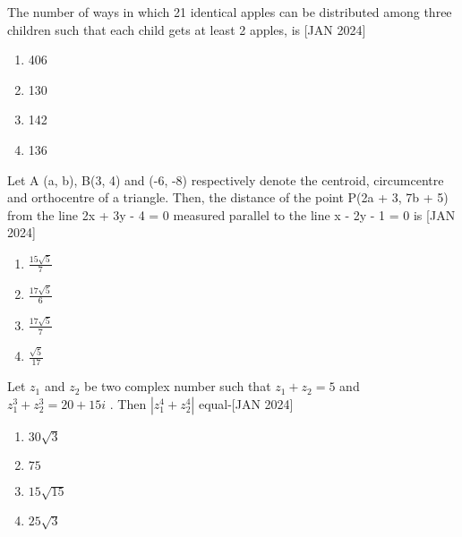 \iffalse
  \title{Assignment}
  \author{ee24btech11030}
  \section{mcq-single}
\fi

\item  The number of ways in which 21 identical apples can be distributed among three children such that each child gets at least 2 apples, is \hfill{[JAN 2024]}
    \begin{multicols}{4}
    \begin{enumerate}
        \item 406
        \item 130
        \item 142
        \item 136
    \end{enumerate}
    \end{multicols}
    \bigskip
    \item Let A (a, b), B(3, 4) and (-6, -8) respectively denote the centroid, circumcentre and orthocentre of a triangle. Then, the distance of the point P(2a + 3, 7b + 5) from the line 2x + 3y - 4 = 0 measured parallel to the line x - 2y - 1 = 0 is  \hfill{[JAN 2024]}
    \begin{multicols}{4}
    \begin{enumerate}
        \item $\frac{15\sqrt{5}}{7}$
        \item $\frac{17\sqrt{5}}{6}$
        \item $\frac{17\sqrt{5}}{7}$
        \item $\frac{\sqrt{5}}{17}$
    \end{enumerate} 
    \end{multicols}
    \bigskip
    \item Let $z_1$ and $z_2$ be two complex number such that $z_1 + z_2 = 5$ and $z_1^3 + z_2^3 = 20 + 15i$ . Then  $|z_1^{4} + z_2^{4}|$ equal-\hfill{[JAN 2024]}
    \begin{multicols}{4}
    \begin{enumerate}
        \item $30\sqrt{3}$
        \item $75$
        \item $15\sqrt{15}$
        \item $25\sqrt{3}$
    \end{enumerate} 
    \end{multicols}
    \bigskip
    
